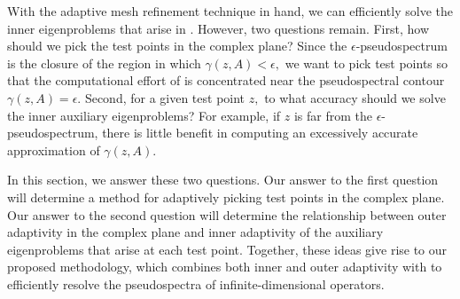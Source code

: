 
With the adaptive mesh refinement technique in hand, we can efficiently solve the inner eigenproblems that arise in . However, two questions remain. First, how should we pick the test points in the complex plane? Since the $\epsilon$-pseudospectrum is the closure of the region in which $\gamma(z, A) < \epsilon,$ we want to pick test points so that the computational effort of  is concentrated near the pseudospectral contour $\gamma(z, A) = \epsilon$.  Second, for a given test point $z,$ to what accuracy should we solve the inner auxiliary eigenproblems? For example, if $z$ is far from the $\epsilon$-pseudospectrum, there is little benefit in computing an excessively accurate approximation of $\gamma(z, A).$





In this section, we answer these two questions. Our answer to the first question will determine a method for adaptively picking test points in the complex plane. Our answer to the second question will determine the relationship between outer adaptivity in the complex plane and inner adaptivity of the auxiliary eigenproblems that arise at each test point. Together, these ideas give rise to our proposed methodology, which combines both inner and outer adaptivity with  to efficiently resolve the pseudospectra of infinite-dimensional operators. 


